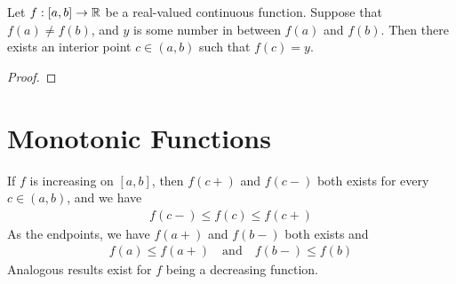 \documentclass[thmcnt=section, 12pt]{my-elegantbook}
\begin{document}
\begin{theorem} \label{thm:11}
    Let $f: [a, b] \to \mathbb{R}$ be a real-valued continuous function. Suppose that $f(a) \neq f(b)$, and $y$ is some number in between $f(a)$ and $f(b)$. Then there exists an interior point $c \in (a, b)$ such that $f(c) = y$.
\end{theorem}

\begin{proof}
\end{proof}


\section{Monotonic Functions}

\begin{theorem} \label{thm:15}
    If $f$ is increasing on $[a, b]$, then $f(c+)$ and $f(c-)$ both exists for every $c \in (a, b)$, and we have
    \begin{align*}
        f(c-) \leq f(c) \leq f(c+)
    \end{align*}
    As the endpoints, we have $f(a+)$ and $f(b-)$ both exists and
    \begin{align}
        f(a) \leq f(a+)
        \quad \text{and} \quad
        f(b-) \leq f(b)
        \label{eq:18}
    \end{align}
    Analogous results exist for $f$ being a decreasing function.
\end{theorem}
\end{document}
